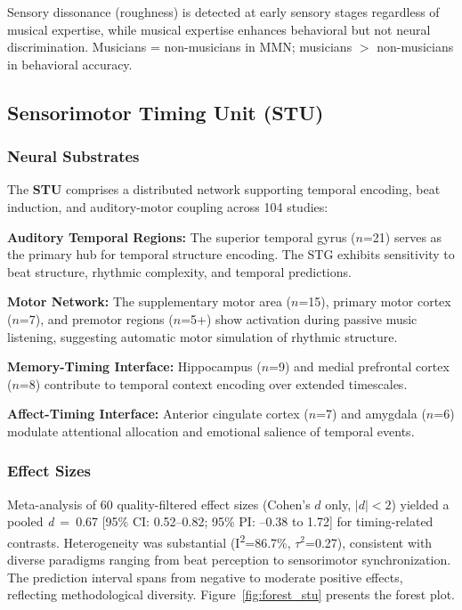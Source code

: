 \documentclass[9pt,onecolumn]{article}
\newcommand{\STU}{\textcolor{stucolor}{\textbf{STU}}}
\newcommand{\cohend}[1]{\textit{d}~=~#1}
\newcommand{\Isquared}{I\textsuperscript{2}}
\newcommand{\tausquared}{$\tau^2$}
\begin{document}
Sensory dissonance (roughness) is detected at early sensory stages regardless of musical expertise, while musical expertise enhances behavioral but not neural discrimination. Musicians = non-musicians in MMN; musicians $>$ non-musicians in behavioral accuracy.

\subsection{Sensorimotor Timing Unit (\STU{})}

\subsubsection{Neural Substrates}

The \STU{} comprises a distributed network supporting temporal encoding, beat induction, and auditory-motor coupling across 104 studies:

\textbf{Auditory Temporal Regions:} The superior temporal gyrus ($n$=21) serves as the primary hub for temporal structure encoding. The STG exhibits sensitivity to beat structure, rhythmic complexity, and temporal predictions.

\textbf{Motor Network:} The supplementary motor area ($n$=15), primary motor cortex ($n$=7), and premotor regions ($n$=5+) show activation during passive music listening, suggesting automatic motor simulation of rhythmic structure.

\textbf{Memory-Timing Interface:} Hippocampus ($n$=9) and medial prefrontal cortex ($n$=8) contribute to temporal context encoding over extended timescales.

\textbf{Affect-Timing Interface:} Anterior cingulate cortex ($n$=7) and amygdala ($n$=6) modulate attentional allocation and emotional salience of temporal events.

\subsubsection{Effect Sizes}

Meta-analysis of 60 quality-filtered effect sizes (Cohen's $d$ only, $|d|<2$) yielded a pooled \cohend{0.67} [95\% CI: 0.52--0.82; 95\% PI: --0.38 to 1.72] for timing-related contrasts. Heterogeneity was substantial (\Isquared{}=86.7\%, \tausquared{}=0.27), consistent with diverse paradigms ranging from beat perception to sensorimotor synchronization. The prediction interval spans from negative to moderate positive effects, reflecting methodological diversity. Figure~\ref{fig:forest_stu} presents the forest plot.
\end{document}
